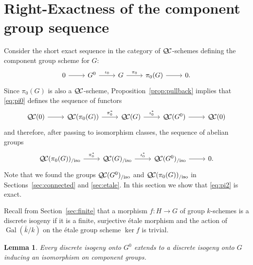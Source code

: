 \documentclass{amsart}
\theoremstyle{plain}
\newtheorem{lemma}[theorem]{Lemma}
\theoremstyle{definition}
\theoremstyle{remark}
\newcommand{\bFq}{\bar{k}}
\newcommand{\Fq}{k}
\DeclareMathOperator{\Gal}{Gal}
\newcommand{\QC}{{\mathcal{Q\hskip-0.8pt C}}}
\newcommand{\QCiso}[1]{\QC(#1)_{/\text{iso}}}
\begin{document}
\section{Right-Exactness of the component group sequence} \label{sec:restriction}

Consider the short exact sequence in the category of $\QC$-schemes
defining the component group scheme for $G$:
\begin{equation}\label{eq:pi0}
\begin{tikzcd}
0 \rar & G^0 \arrow{r}{\iota_0} & G \arrow{r}{\pi_0} & \pi_0(G) \rar & 0.
\end{tikzcd}
\end{equation}
Since $\pi_0(G)$ is also a $\QC$-scheme,
Proposition~\ref{prop:pullback} implies that \eqref{eq:pi0} defines the sequence of functors
\begin{equation}\label{eq:pi1}
\begin{tikzcd}
\QC(0) \rar & \QC(\pi_0(G)) \arrow{r}{\pi_0^*} & \QC(G) \arrow{r}{\iota_0^*} & \QC(G^0) \rar & \QC(0)
\end{tikzcd}
\end{equation}
and therefore, after passing to isomorphism classes, the sequence of abelian groups
\begin{equation}\label{eq:pi2}
\begin{tikzcd}
\QCiso{\pi_0(G)} \arrow{r}{\pi_0^*} & \QCiso{G} \arrow{r}{\iota_0^*} & \QCiso{G^0} \rar & 0.
\end{tikzcd}
\end{equation}
 Note that we found the groups $\QCiso{G^0}$
and $\QCiso{\pi_0(G)}$
in Sections~\ref{sec:connected} and \ref{sec:etale}.
In this section we show that \eqref{eq:pi2} is exact.

Recall from Section~\ref{sec:finite} that
a morphism $f : H\to G$ of group $\Fq$-schemes is a discrete isogeny
if it is a finite, surjective \'etale morphism and
the action of $\Gal(\bFq/\Fq)$ on the \'etale group scheme $\ker f$ is trivial.

\begin{lemma}\label{lemma:ext}
Every discrete isogeny onto $G^0$ extends to a discrete
isogeny onto $G$ inducing an isomorphism on component groups.
\end{lemma}
\end{document}
